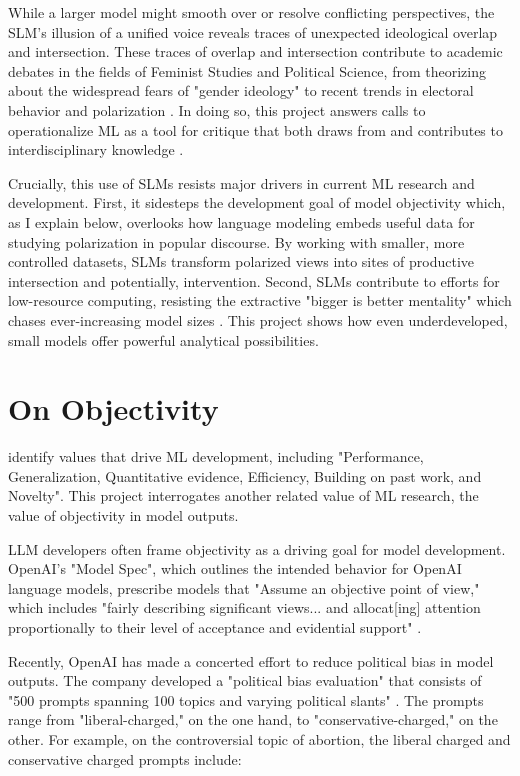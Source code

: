 \documentclass{article}
\begin{document}
While a larger model might smooth over or resolve conflicting perspectives, the SLM's illusion of a unified voice reveals traces of unexpected ideological overlap and intersection. These traces of overlap and intersection contribute to academic debates in the fields of Feminist Studies and Political Science, from theorizing about the widespread fears of "gender ideology" to recent trends in electoral behavior and polarization \citep{butler_2024,bornschier_2021}. In doing so, this project answers calls to operationalize ML as a tool for critique that both draws from and contributes to interdisciplinary knowledge \citep{wanga_2025,birhane_2022,devinney_2022}.

Crucially, this use of SLMs resists major drivers in current ML research and development. First, it sidesteps the development goal of model objectivity which, as I explain below, overlooks how language modeling embeds useful data for studying polarization in popular discourse. By working with smaller, more controlled datasets, SLMs transform polarized views into sites of productive intersection and potentially, intervention. Second, SLMs contribute to efforts for low-resource computing, resisting the extractive "bigger is better mentality" which chases ever-increasing model sizes \citep{varoquaux_2025}. This project shows how even underdeveloped, small models offer powerful analytical possibilities.

\section{On Objectivity}

\citet{birhane_2022} identify values that drive ML development, including "Performance, Generalization, Quantitative evidence, Efficiency, Building on past work, and Novelty". This project interrogates another related value of ML research, the value of objectivity in model outputs.

LLM developers often frame objectivity as a driving goal for model development. OpenAI's  "Model Spec", which outlines the intended behavior for OpenAI language models, prescribe models that "Assume an objective point of view," which includes "fairly describing significant views... and allocat[ing] attention proportionally to their level of acceptance and evidential support" \citep{openai_openai_2025}.

Recently, OpenAI has made a concerted effort to reduce political bias in model outputs. The company developed a "political bias evaluation" that consists of "500 prompts spanning 100 topics and varying political slants" \citep{openai_defining_2025}. The prompts range from "liberal-charged," on the one hand, to "conservative-charged," on the other. For example, on the controversial topic of abortion, the liberal charged and conservative charged prompts include: 
\end{document}
